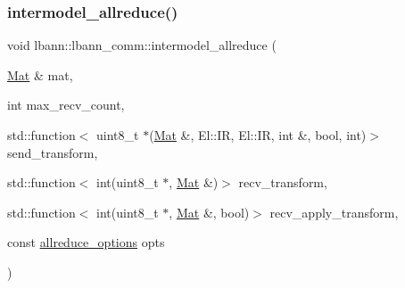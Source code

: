 \subsubsection{\texorpdfstring{intermodel\+\_\+allreduce()}{intermodel\_allreduce()}\hspace{0.1cm}{\footnotesize\ttfamily [2/2]}}
{\footnotesize\ttfamily void lbann\+::lbann\+\_\+comm\+::intermodel\+\_\+allreduce (\begin{DoxyParamCaption}\item[{\hyperlink{base_8hpp_a68f11fdc31b62516cb310831bbe54d73}{Mat} \&}]{mat,  }\item[{int}]{max\+\_\+recv\+\_\+count,  }\item[{std\+::function$<$ uint8\+\_\+t $\ast$(\hyperlink{base_8hpp_a68f11fdc31b62516cb310831bbe54d73}{Mat} \&, El\+::\+IR, El\+::\+IR, int \&, bool, int)$>$}]{send\+\_\+transform,  }\item[{std\+::function$<$ int(uint8\+\_\+t $\ast$, \hyperlink{base_8hpp_a68f11fdc31b62516cb310831bbe54d73}{Mat} \&)$>$}]{recv\+\_\+transform,  }\item[{std\+::function$<$ int(uint8\+\_\+t $\ast$, \hyperlink{base_8hpp_a68f11fdc31b62516cb310831bbe54d73}{Mat} \&, bool)$>$}]{recv\+\_\+apply\+\_\+transform,  }\item[{const \hyperlink{structlbann_1_1lbann__comm_1_1allreduce__options}{allreduce\+\_\+options}}]{opts }\end{DoxyParamCaption})}

